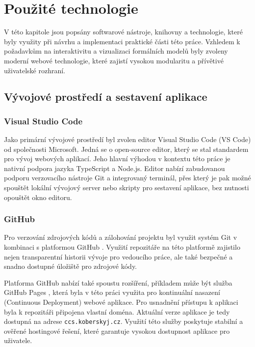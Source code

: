 \chapter{Použité technologie}
\label{sec:technologie}

V této kapitole jsou popsány softwarové nástroje, knihovny a technologie, které byly využity při návrhu a implementaci praktické části této práce. 
Vzhledem k požadavkům na interaktivitu a vizualizaci formálních modelů byly zvoleny moderní webové technologie, které zajistí vysokou modularitu a přívětivé uživatelské rozhraní.

\section{Vývojové prostředí a sestavení aplikace}

\subsection{Visual Studio Code}
Jako primární vývojové prostředí byl zvolen editor Visual Studio Code (VS Code) \cite{microsoft_2025_visual} od společnosti Microsoft. 
Jedná se o open-source editor, který se stal standardem pro vývoj webových aplikací. 
Jeho hlavní výhodou v kontextu této práce je nativní podpora jazyka TypeScript a Node.js. 
Editor nabízí zabudovanou podporu verzovacího nástroje Git a integrovaný terminál, přes který je pak možné spouštět lokální vývojový server nebo skripty pro sestavení aplikace, bez nutnosti opouštět okno editoru.

\subsection{GitHub}
Pro verzování zdrojových kódů a zálohování projektu byl využit systém Git v kombinaci s platformou GitHub \cite{github_2025_github}. 
Využití repozitáře na této platformě zajistilo nejen transparentní historii vývoje pro vedoucího práce, ale také bezpečné a snadno dostupné úložiště pro zdrojové kódy. 

Platforma GitHub nabízí také spoustu rozšíření, příkladem může být služba GitHub Pages \cite{github_pages_2026_github}, která byla v této práci využita pro kontinuální nasazení (Continuous Deployment) webové aplikace. 
Pro usnadnění přístupu k aplikaci byla k repozitáři připojena vlastní doména. 
Aktuální verze aplikace je tedy dostupná na adrese \texttt{ccs.koberskyj.cz}. 
Využití této služby poskytuje stabilní a ověřené hostingové řešení, které garantuje vysokou dostupnost aplikace pro uživatele.


